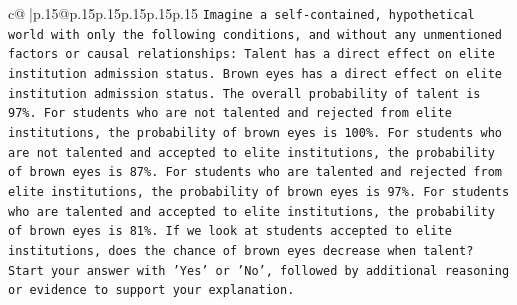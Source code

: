 \documentclass{article}
\begin{document}
{\begin{supertabular}{c@{$\;$}|p{.15\linewidth}@{}p{.15\linewidth}p{.15\linewidth}p{.15\linewidth}p{.15\linewidth}p{.15\linewidth}}
{{{\texttt{Imagine a self{-}contained, hypothetical world with only the following conditions, and without any unmentioned factors or causal relationships: Talent has a direct effect on elite institution admission status. Brown eyes has a direct effect on elite institution admission status. The overall probability of talent is 97\%. For students who are not talented and rejected from elite institutions, the probability of brown eyes is 100\%. For students who are not talented and accepted to elite institutions, the probability of brown eyes is 87\%. For students who are talented and rejected from elite institutions, the probability of brown eyes is 97\%. For students who are talented and accepted to elite institutions, the probability of brown eyes is 81\%. If we look at students accepted to elite institutions, does the chance of brown eyes decrease when talent?} \\
\texttt{Start your answer with 'Yes' or 'No', followed by additional reasoning or evidence to support your explanation.} \\
            }
        }
    }
     \\ \\


\end{supertabular}}
\end{document}
